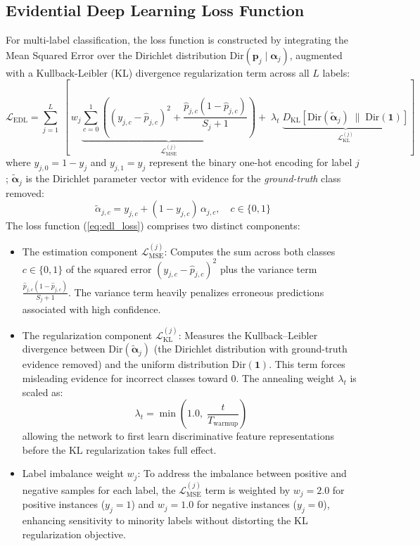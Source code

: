 \documentclass[conference]{IEEEtran}
\begin{document}
\subsection{Evidential Deep Learning Loss Function} 
For multi-label classification, the loss function is constructed by integrating the Mean Squared Error over the Dirichlet distribution $\mathrm{Dir}(\mathbf{p}_j \mid \boldsymbol{\alpha}_j)$, augmented with a Kullback-Leibler (KL) divergence regularization term across all $L$ labels:
\begin{equation}
    \mathcal{L}_{\mathrm{EDL}} = \sum_{j=1}^{L}\; \left[\,
        w_j \underbrace{\sum_{c=0}^{1}\left(
            (y_{j,c} - \hat{p}_{j,c})^2 + \frac{\hat{p}_{j,c}(1 - \hat{p}_{j,c})}{S_j + 1}
        \right)}_{\mathcal{L}_{\mathrm{MSE}}^{(j)}}
        +\; \lambda_t\;
        \underbrace{D_{\mathrm{KL}}\!\left[\mathrm{Dir}(\tilde{\boldsymbol{\alpha}}_j) \;\|\; \mathrm{Dir}(\mathbf{1})\right]}_{\mathcal{L}_{\mathrm{KL}}^{(j)}}
    \right]
    \label{eq:edl_loss}
\end{equation}
where $y_{j,0} = 1 - y_j$ and $y_{j,1} = y_j$ represent the binary one-hot encoding for label $j$; $\tilde{\boldsymbol{\alpha}}_j$ is the Dirichlet parameter vector with evidence for the \textit{ground-truth} class removed:
\begin{equation}
    \tilde{\alpha}_{j,c} = y_{j,c} + (1 - y_{j,c})\,\alpha_{j,c}, \quad c \in \{0, 1\}
    \label{eq:alpha_tilde}
\end{equation}
The loss function (\ref{eq:edl_loss}) comprises two distinct components:
\begin{itemize}
    \item The estimation component $\mathcal{L}_{\mathrm{MSE}}^{(j)}$: Computes the sum across both classes $c \in \{0,1\}$ of the squared error $(y_{j,c} - \hat{p}_{j,c})^2$ plus the variance term $\frac{\hat{p}_{j,c}(1-\hat{p}_{j,c})}{S_j+1}$. The variance term heavily penalizes erroneous predictions associated with high confidence.
    \item The regularization component $\mathcal{L}_{\mathrm{KL}}^{(j)}$: Measures the Kullback--Leibler divergence between $\mathrm{Dir}(\tilde{\boldsymbol{\alpha}}_j)$ (the Dirichlet distribution with ground-truth evidence removed) and the uniform distribution $\mathrm{Dir}(\mathbf{1})$. This term forces misleading evidence for incorrect classes toward $0$. The annealing weight $\lambda_t$ is scaled as:
    \begin{equation}
        \lambda_t = \min\!\left(1.0,\; \frac{t}{T_{\mathrm{warmup}}}\right)
        \label{eq:lambda}
    \end{equation}
    allowing the network to first learn discriminative feature representations before the KL regularization takes full effect.
    \item Label imbalance weight $w_j$: To address the imbalance between positive and negative samples for each label, the $\mathcal{L}_{\mathrm{MSE}}^{(j)}$ term is weighted by $w_j = 2.0$ for positive instances ($y_j = 1$) and $w_j = 1.0$ for negative instances ($y_j = 0$), enhancing sensitivity to minority labels without distorting the KL regularization objective.
\end{itemize}
\end{document}
